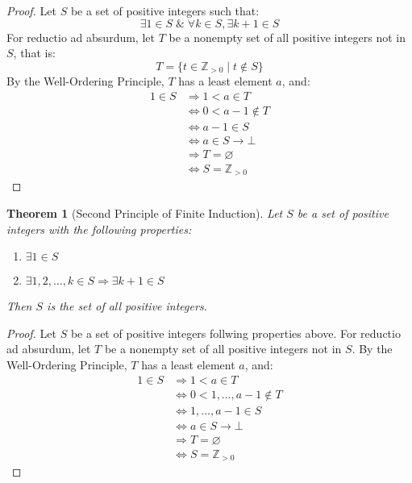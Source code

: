 \documentclass[atbegshi, chapter]{memoir}
\newtheorem{thm}{Theorem}[chapter]
\begin{document}
\begin{proof}
  Let $S$ be a set of positive integers such that:
  \[
    \exists 1\in S\;\&\;\forall k\in S, \exists k+1\in S
  \]
  For reductio ad absurdum, 
  let $T$ be a nonempty set of all positive integers not in $S$, that is:
  \[
    T=\{t\in\mathbb{Z}_{>0}\;|\;t\notin S\}
  \]
  By the Well-Ordering Principle, $T$ has a least element $a$, and:
  \begin{align*}
    1\in S &\Rightarrow 1<a\in T \\
           &\Leftrightarrow 0<a-1\notin T \\
           &\Leftrightarrow a-1\in S\\
           &\Leftrightarrow a\in S\longrightarrow\bot\\
           &\Rightarrow T=\varnothing\\
           &\Leftrightarrow S = \mathbb{Z}_{>0}
  \end{align*}
\end{proof}
\begin{thm}[Second Principle of Finite Induction]
  Let $S$ be a set of positive integers with the following properties:
  \begin{enumerate}[label=(\alph*)]
    \item $\exists1\in S$
    \item $\exists 1,2,\ldots, k\in S\Rightarrow \exists k+1\in S$
  \end{enumerate}
  Then $S$ is the set of all positive integers.
\end{thm}
\begin{proof}
  Let $S$ be a set of positive integers follwing properties above.
  For reductio ad absurdum, let $T$ be a nonempty set of all positive integers
  not in $S$. By the Well-Ordering Principle, $T$ has a least element $a$, and:
  \begin{align*}
    1\in S &\Rightarrow 1<a\in T \\
           &\Leftrightarrow 0<1,\ldots,a-1\notin T\\
           &\Leftrightarrow 1,\ldots,a-1\in S \\
           &\Leftrightarrow a\in S \longrightarrow\bot\\
           &\Rightarrow T = \varnothing \\
           &\Leftrightarrow S = \mathbb{Z}_{>0}
  \end{align*}
\end{proof}
\end{document}
